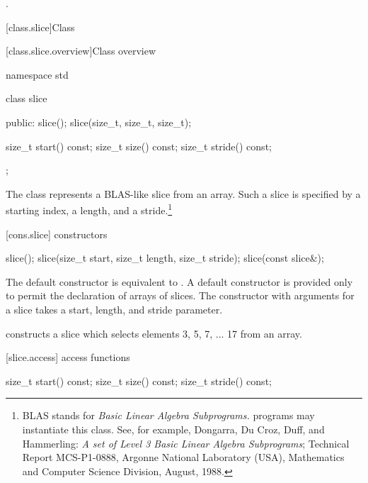 \begin{itemdescr}
\pnum
\effects {}.
\end{itemdescr}


[class.slice]{Class }

[class.slice.overview]{Class  overview}

%
\begin{codeblock}
namespace std {
  class slice {
  public:
    slice();
    slice(size_t, size_t, size_t);

    size_t start() const;
    size_t size() const;
    size_t stride() const;
  };
}
\end{codeblock}

\pnum
The
class represents a BLAS-like slice from an array.
Such a slice is specified by a starting index, a length, and a
stride.\footnote{BLAS stands for
\textit{Basic Linear Algebra Subprograms.}
\Cpp programs may instantiate this class.
See, for example,
Dongarra, Du Croz, Duff, and Hammerling:
\textit{A set of Level 3 Basic Linear Algebra Subprograms};
Technical Report MCS-P1-0888,
Argonne National Laboratory (USA),
Mathematics and Computer Science Division,
August, 1988.}

[cons.slice]{ constructors}

%
\begin{itemdecl}
slice();
slice(size_t start, size_t length, size_t stride);
slice(const slice&);
\end{itemdecl}

\begin{itemdescr}
\pnum
The default constructor is equivalent to .
A default constructor is provided only to permit the declaration of arrays of slices.
The constructor with arguments for a slice takes a start, length, and stride
parameter.

\pnum
\enterexample
{}
constructs a slice which selects elements 3, 5, 7, ... 17 from an array.
\exitexample
\end{itemdescr}

[slice.access]{ access functions}
%
%
%
\begin{itemdecl}
size_t start() const;
size_t size() const;
size_t stride() const;
\end{itemdecl}

